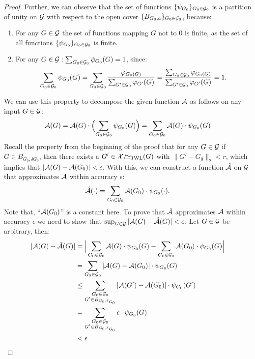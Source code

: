 \begin{proof}
    Further, we can observe that the set of functions $\{ \psi_{G_0}\}_{G_0 \in \mathcal{G}_0}$ is a partition of unity on $\mathcal{G}$ with respect to the open cover $\{ B_{G_0, a} \}_{G_0 \in \mathcal{G}_0}$, because:
    \begin{enumerate}
        \item For any $G \in \mathcal{G}$ the set of functions mapping $G$ not to $0$ is finite, as the set of all functions $\{ \psi_{G_0}\}_{G_0 \in \mathcal{G}_0}$ is finite.
        \item For any $G \in \mathcal{G}: \sum_{G_0 \in \mathcal{G}_0} \psi_{G_0}(G) = 1$, since: \begin{align*}
            \sum_{G_0 \in \mathcal{G}_0} \psi_{G_0}(G) = \sum_{G_0 \in \mathcal{G}_0} \frac{\varphi_{G_0(G)}}{\sum_{G' \in \mathcal{G}_0} \varphi_{G'}(G)} = \frac{\sum_{G_0 \in \mathcal{G}_0} \varphi_{G_0(G)}}{\sum_{G' \in \mathcal{G}_0} \varphi_{G'}(G)}= 1.
        \end{align*}
    \end{enumerate}
    We can use this property to decompose the given function $\mathcal{A}$ as follows on any input $G \in \mathcal{G}$:
    \begin{equation*}
        \mathcal{A}(G) = \mathcal{A}(G) \cdot \Bigl( \sum_{G_0 \in \mathcal{G}_0} \psi_{G_0}(G) \Bigr) = \sum_{G_0 \in \mathcal{G}_0} \mathcal{A}(G) \cdot \psi_{G_0}(G) 
    \end{equation*}
    Recall the property from the beginning of the proof that for any $G \in \mathcal{G}$ if $G \in B_{G_0, \delta{G_0}}$, then there exists a $G' \in \mathcal{X}/\!{\simeq_{\text{1WL}}}(G)$ with $\| G' - G_0 \|_2 < r$, which implies that $|\mathcal{A}(G) - \mathcal{A}(G_0)| < \epsilon$. With this, we can construct a function $\hat{\mathcal{A}}$ on $\mathcal{G}$ that approximates $\mathcal{A}$ within accuracy $\epsilon$:
    \begin{equation*}
        \hat{\mathcal{A}}(\cdot) = \sum_{G_0 \in \mathcal{G}_0} \mathcal{A}(G_0) \cdot \psi_{G_0}(\cdot).
    \end{equation*}
    Note that, ``$\mathcal{A}(G_0)$'' is a constant here.
    To prove that $\hat{\mathcal{A}}$ approximates $\mathcal{A}$ within accuracy $\epsilon$ we need to show that $\sup_{G \in \mathcal{G}} |\mathcal{A}(G) - \hat{\mathcal{A}}(G) | < \epsilon$. Let $G \in \mathcal{G}$ be arbitrary, then:
    \begin{align*}
        |\mathcal{A}(G) - \hat{\mathcal{A}}(G) | &= \Big|\sum_{G_0 \in \mathcal{G}_0} \mathcal{A}(G) \cdot \psi_{G_0}(G) - \sum_{G_0 \in \mathcal{G}_0} \mathcal{A}(G_0) \cdot \psi_{G_0}(G)\Big|\\
        &= \sum_{G_0 \in \mathcal{G}_0} |\mathcal{A}(G) - \mathcal{A}(G_0) | \cdot \psi_{G_0}(G)\\
        &\leq \sum_{\substack{G_0 \in \mathcal{G}_0\\G' \in B_{G_0, \delta_{G_0}}}}|\mathcal{A}(G') - \mathcal{A}(G_0) | \cdot \psi_{G_0}(G')\\
        &= \sum_{\substack{G_0 \in \mathcal{G}_0\\G' \in B_{G_0, \delta_{G_0}}}} \epsilon \cdot \psi_{G_0}(G)\\
        &< \epsilon
    \end{align*}
    
\end{proof}

\newpage